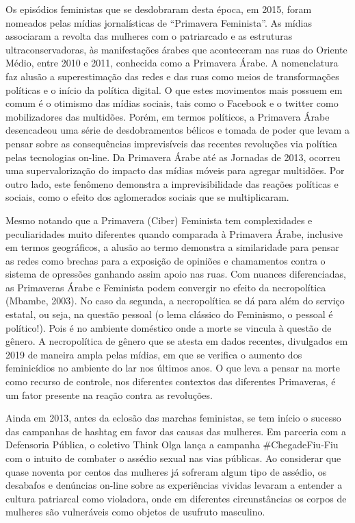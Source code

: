 Os episódios feministas que se desdobraram desta época, em 2015, foram
nomeados pelas mídias jornalísticas de ``Primavera Feminista''. As
mídias associaram a revolta das mulheres com o patriarcado e as
estruturas ultraconservadoras, às manifestações árabes que aconteceram
nas ruas do Oriente Médio, entre 2010 e 2011, conhecida como a Primavera
Árabe. A nomenclatura faz alusão a superestimação das redes e das ruas
como meios de transformações políticas e o início da política digital. O
que estes movimentos mais possuem em comum é o otimismo das mídias
sociais, tais como o Facebook e o twitter como mobilizadores das
multidões. Porém, em termos políticos, a Primavera Árabe desencadeou uma
série de desdobramentos bélicos e tomada de poder que levam a pensar
sobre as consequências imprevisíveis das recentes revoluções via
política pelas tecnologias on-line. Da Primavera Árabe até as Jornadas
de 2013, ocorreu uma supervalorização do impacto das mídias móveis para
agregar multidões. Por outro lado, este fenômeno demonstra a
imprevisibilidade das reações políticas e sociais, como o efeito dos
aglomerados sociais que se multiplicaram.

Mesmo notando que a Primavera (Ciber) Feminista tem complexidades e
peculiaridades muito diferentes quando comparada à Primavera Árabe,
inclusive em termos geográficos, a alusão ao termo demonstra a
similaridade para pensar as redes como brechas para a exposição de
opiniões e chamamentos contra o sistema de opressões ganhando assim
apoio nas ruas. Com nuances diferenciadas, as Primaveras Árabe e
Feminista podem convergir no efeito da necropolítica (Mbambe, 2003). No
caso da segunda, a necropolítica se dá para além do serviço estatal, ou
seja, na questão pessoal (o lema clássico do Feminismo, o pessoal é
político!). Pois é no ambiente doméstico onde a morte se vincula à
questão de gênero. A necropolítica de gênero que se atesta em dados
recentes, divulgados em 2019 de maneira ampla pelas mídias, em que se
verifica o aumento dos feminicídios no ambiente do lar nos últimos anos.
O que leva a pensar na morte como recurso de controle, nos diferentes
contextos das diferentes Primaveras, é um fator presente na reação
contra as revoluções.

Ainda em 2013, antes da eclosão das marchas feministas, se tem início o
sucesso das campanhas de hashtag em favor das causas das mulheres. Em
parceria com a Defensoria Pública, o coletivo Think Olga lança a
campanha \#ChegadeFiu-Fiu com o intuito de combater o assédio sexual nas
vias públicas. Ao considerar que quase noventa por centos das mulheres
já sofreram algum tipo de assédio, os desabafos e denúncias on-line
sobre as experiências vividas levaram a entender a cultura patriarcal
como violadora, onde em diferentes circunstâncias os corpos de mulheres
são vulneráveis como objetos de usufruto masculino.

